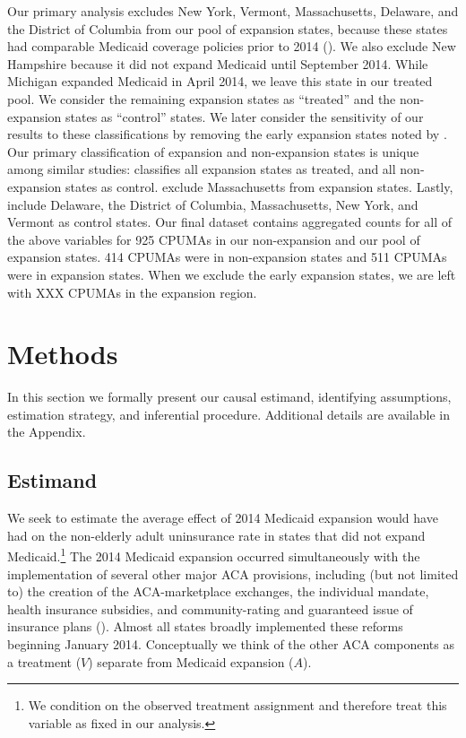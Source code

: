 \documentclass[12pt]{article}
\begin{document}
Our primary analysis excludes New York, Vermont, Massachusetts, Delaware, and the District of Columbia from our pool of expansion states, because these states had comparable Medicaid coverage policies prior to 2014 (\cite{kaestner2017effects}). We also exclude New Hampshire because it did not expand Medicaid until September 2014. While Michigan expanded Medicaid in April 2014, we leave this state in our treated pool. We consider the remaining expansion states as ``treated'' and the non-expansion states as ``control'' states. We later consider the sensitivity of our results to these classifications by removing the early expansion states noted by \cite{frean2017premium}. Our primary classification of expansion and non-expansion states is unique among similar studies: \cite{courtemanche2017early} classifies all expansion states as treated, and all non-expansion states as control. \cite{frean2017premium} exclude Massachusetts from expansion states. Lastly, \cite{kaestner2017effects} include Delaware, the District of Columbia, Massachusetts, New York, and Vermont as control states. Our final dataset contains aggregated counts for all of the above variables for 925 CPUMAs in our non-expansion and our pool of expansion states. 414 CPUMAs were in non-expansion states and 511 CPUMAs were in expansion states. When we exclude the early expansion states, we are left with XXX CPUMAs in the expansion region.

\section{Methods}
\label{sec:methods}

In this section we formally present our causal estimand, identifying assumptions, estimation strategy, and inferential procedure. Additional details are available in the Appendix.

\subsection{Estimand}

We seek to estimate the average effect of 2014 Medicaid expansion would have had on the non-elderly adult uninsurance rate in states that did not expand Medicaid.\footnote{We condition on the observed treatment assignment and therefore treat this variable as fixed in our analysis.} The 2014 Medicaid expansion occurred simultaneously with the implementation of several other major ACA provisions, including (but not limited to) the creation of the ACA-marketplace exchanges, the individual mandate, health insurance subsidies, and community-rating and guaranteed issue of insurance plans (\cite{courtemanche2017early}). Almost all states broadly implemented these reforms beginning January 2014. Conceptually we think of the other ACA components as a treatment ($V$) separate from Medicaid expansion ($A$).
\end{document}
